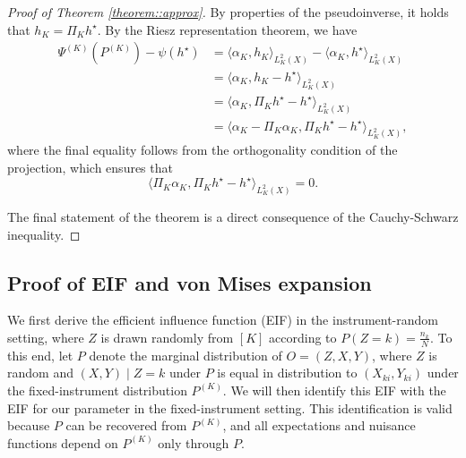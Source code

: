 \documentclass[11pt]{article}
\theoremstyle{plain}
\theoremstyle{definition}
\theoremstyle{remark}
\theoremstyle{definition}
\begin{document}
 \begin{proof}[Proof of Theorem \ref{theorem::approx}]
By properties of the pseudoinverse, it holds that \( h_K = \Pi_{K} h^\star \). By the Riesz representation theorem, we have
\begin{align*}
    \Psi^{(K)}(P^{(K)}) - \psi(h^\star) 
    &= \langle \alpha_K, h_K \rangle_{L^2_K(X)} - \langle \alpha_K, h^\star \rangle_{L^2_K(X)} \\
    &= \langle \alpha_K, h_K - h^\star \rangle_{L^2_K(X)} \\
    &= \langle \alpha_K, \Pi_{K} h^\star - h^\star \rangle_{L^2_K(X)} \\
    &= \langle \alpha_K - \Pi_{K} \alpha_K, \Pi_{K} h^\star - h^\star \rangle_{L^2_K(X)},
\end{align*}
where the final equality follows from the orthogonality condition of the projection, which ensures that
\[
\langle \Pi_{K} \alpha_K, \Pi_{K} h^\star - h^\star \rangle_{L^2_K(X)} = 0.
\]

The final statement of the theorem is a direct consequence of the Cauchy-Schwarz inequality.

     
 \end{proof}
 
 
 



\subsection{Proof of EIF and von Mises expansion}

 

We first derive the efficient influence function (EIF) in the instrument-random setting, where \( Z \) is drawn randomly from \([K] \) according to \( P(Z = k) = \frac{n_k}{N} \). To this end, let \( P \) denote the marginal distribution of \( O = (Z, X, Y) \), where \( Z \) is random and \( (X, Y) \mid Z = k \) under \( P \) is equal in distribution to \( (X_{ki}, Y_{ki}) \) under the fixed-instrument distribution \( P^{(K)} \). We will then identify this EIF with the EIF for our parameter in the fixed-instrument setting. This identification is valid because \( P \) can be recovered from \( P^{(K)} \), and all expectations and nuisance functions depend on \( P^{(K)} \) only through \( P \).
\end{document}
